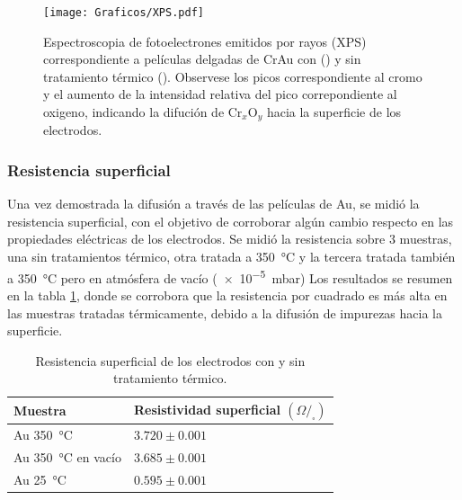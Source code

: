 {				\begin{figure}[ht!]
		 	       	\begin{center}
		 	       	\texttt{[image: Graficos/XPS.pdf]}
		        	\caption[XPS de peliculas delgadas de Cr\textbar Au]{Espectroscopia de fotoelectrones emitidos por rayos (XPS) correspondiente a películas delgadas de Cr\textbar Au con (\usebox{\rojo}) y sin tratamiento térmico  (\usebox{\marron}). Observese los picos correspondiente al cromo y el aumento de la intensidad relativa del pico correpondiente al oxigeno, indicando la difución de Cr$_x$O$_y$ hacia la superficie de los electrodos.}
		         	\label{fig:XPS}
		         	\end{center}
		     		\end{figure}
		
		\subsubsection{Resistencia superficial}

			Una vez demostrada la difusión a través de las películas de Au, se midió la resistencia superficial, con el objetivo de corroborar algún cambio respecto en las propiedades eléctricas de los electrodos. Se midió la resistencia sobre 3 muestras, una sin tratamientos térmico, otra tratada a \SI{350}{\celsius} y la tercera tratada también a \SI{350}{\celsius} pero en atmósfera de vacío (\SI{e-5}{\milli\bar}) Los resultados se resumen en la tabla \ref{tabla:resistencia}, donde se corrobora que la resistencia por cuadrado es más alta en las muestras tratadas térmicamente, debido a la difusión de impurezas hacia la superficie. 

				\begin{table}[ht!]
			  		  \caption[Resistencia superficial de los electrodos]{Resistencia superficial de los electrodos con y sin tratamiento térmico.} 
			  		  \begin{tabular}{>{\raggedright\arraybackslash}m{4.2cm}>{\raggedright\arraybackslash}m{7.075cm}} 
			  		  \toprule
					  Muestra & Resistividad superficial $(\Omega/_{\square})$  \\ \midrule
			      	  Au \SI{350}{\celsius} 		  	& $3.720 \pm 0.001$		 \\	  
			      	  Au \SI{350}{\celsius} en vacío	& $3.685 \pm 0.001$		 \\	  
			      	  Au \SI{25}{\celsius}    	  		& $0.595 \pm 0.001$		 \\ 
			      	  \bottomrule
			    	  \end{tabular}
			    	  \label{tabla:resistencia}
			   		  \end{table}
		
}
